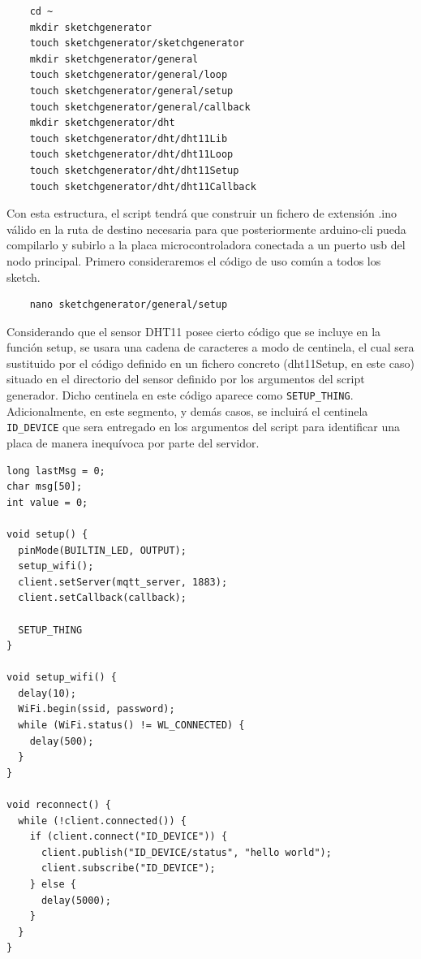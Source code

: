 \begin{verbatim}
    cd ~
    mkdir sketchgenerator
    touch sketchgenerator/sketchgenerator
    mkdir sketchgenerator/general
    touch sketchgenerator/general/loop
    touch sketchgenerator/general/setup
    touch sketchgenerator/general/callback
    mkdir sketchgenerator/dht
    touch sketchgenerator/dht/dht11Lib
    touch sketchgenerator/dht/dht11Loop
    touch sketchgenerator/dht/dht11Setup
    touch sketchgenerator/dht/dht11Callback
\end{verbatim}

Con esta estructura, el \gls{script} tendrá que construir un fichero de extensión .ino válido en la ruta de destino necesaria para que posteriormente arduino-cli pueda compilarlo y subirlo a la placa microcontroladora conectada a un puerto \gls{usb} del nodo principal. Primero consideraremos el código de uso común a todos los \gls{sketch}.

\begin{verbatim}
    nano sketchgenerator/general/setup
\end{verbatim}

Considerando que el sensor DHT11 posee cierto código que se incluye en la función setup, se usara una cadena de caracteres a modo de centinela, el cual sera sustituido por el código definido en un fichero concreto (dht11Setup, en este caso) situado en el directorio del sensor definido por los argumentos del script generador. Dicho centinela en este código aparece como \verb|SETUP_THING|. Adicionalmente, en este segmento, y demás casos, se incluirá el centinela \verb|ID_DEVICE| que sera entregado en los argumentos del script para identificar una placa de manera inequívoca por parte del servidor.

\begin{verbatim}
long lastMsg = 0;
char msg[50];
int value = 0;

void setup() {
  pinMode(BUILTIN_LED, OUTPUT);
  setup_wifi();
  client.setServer(mqtt_server, 1883);
  client.setCallback(callback);

  SETUP_THING
}

void setup_wifi() {
  delay(10);
  WiFi.begin(ssid, password);
  while (WiFi.status() != WL_CONNECTED) {
    delay(500);
  }
}

void reconnect() {
  while (!client.connected()) {
    if (client.connect("ID_DEVICE")) {
      client.publish("ID_DEVICE/status", "hello world");
      client.subscribe("ID_DEVICE");
    } else {
      delay(5000);
    }
  }
}
\end{verbatim}

